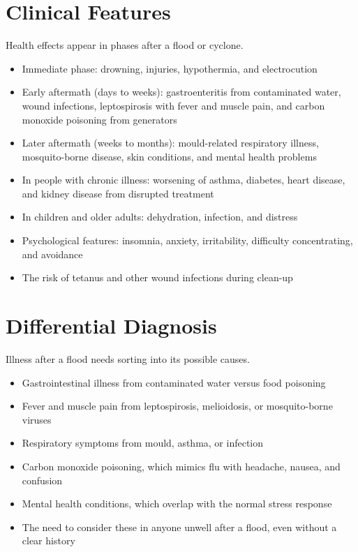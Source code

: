 \section*{Clinical Features}
Health effects appear in phases after a flood or cyclone.
\begin{itemize}
    \item Immediate phase: drowning, injuries, hypothermia, and electrocution
    \item Early aftermath (days to weeks): gastroenteritis from contaminated water, wound infections, leptospirosis with fever and muscle pain, and carbon monoxide poisoning from generators
    \item Later aftermath (weeks to months): mould-related respiratory illness, mosquito-borne disease, skin conditions, and mental health problems
    \item In people with chronic illness: worsening of asthma, diabetes, heart disease, and kidney disease from disrupted treatment
    \item In children and older adults: dehydration, infection, and distress
    \item Psychological features: insomnia, anxiety, irritability, difficulty concentrating, and avoidance
    \item The risk of tetanus and other wound infections during clean-up
\end{itemize}

\section*{Differential Diagnosis}
Illness after a flood needs sorting into its possible causes.
\begin{itemize}
    \item Gastrointestinal illness from contaminated water versus food poisoning
    \item Fever and muscle pain from leptospirosis, melioidosis, or mosquito-borne viruses
    \item Respiratory symptoms from mould, asthma, or infection
    \item Carbon monoxide poisoning, which mimics flu with headache, nausea, and confusion
    \item Mental health conditions, which overlap with the normal stress response
    \item The need to consider these in anyone unwell after a flood, even without a clear history
\end{itemize}

